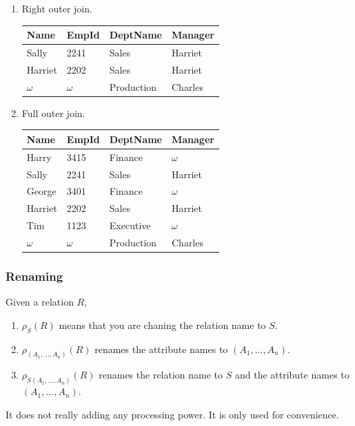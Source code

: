 \begin{example}
\begin{enumerate}
        \item Right outer join. 

        \begin{center}
          \begin{tabular}{|l|l|l|l|}
          \hline
          Name & EmpId & DeptName & Manager \\
          \hline
          Sally & 2241 & Sales & Harriet \\
          Harriet & 2202 & Sales & Harriet \\
          $\omega$ & $\omega$ & Production & Charles \\
          \hline
          \end{tabular}
        \end{center}

        \item Full outer join. 
        \begin{center}
          \begin{tabular}{|l|l|l|l|}
          \hline
          Name & EmpId & DeptName & Manager \\
          \hline
          Harry & 3415 & Finance & $\omega$ \\
          Sally & 2241 & Sales & Harriet \\
          George & 3401 & Finance & $\omega$ \\
          Harriet & 2202 & Sales & Harriet \\
          Tim & 1123 & Executive & $\omega$ \\
          $\omega$ & $\omega$ & Production & Charles \\
          \hline
          \end{tabular}
        \end{center}
      \end{enumerate}
    \end{example}

  \subsubsection{Renaming}

    \begin{definition}[Renaming]
      Given a relation $R$, 
      \begin{enumerate}
        \item $\rho_S (R)$ means that you are chaning the relation name to $S$. 
        \item $\rho_{(A_1, \ldots, A_n)} (R)$ renames the attribute names to $(A_1, \ldots, A_n)$. 
        \item $\rho_{S(A_1, \ldots, A_n)} (R)$ renames the relation name to $S$ and the attribute names to $(A_1, \ldots, A_n)$. 
      \end{enumerate}
      It does not really adding any processing power. It is only used for convenience. 
    \end{definition}

